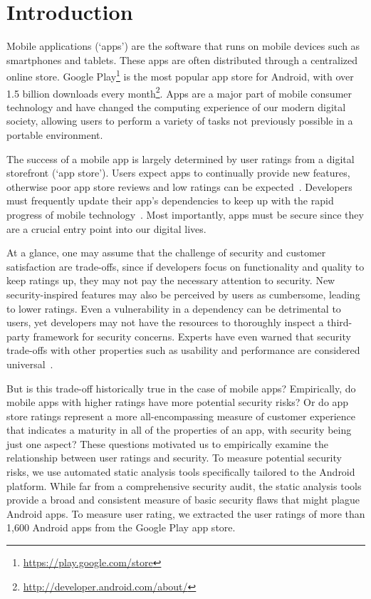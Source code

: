 \documentclass{sig-alternate}
\begin{document}
\section{Introduction}
%
Mobile applications (`apps') are the software that runs on mobile devices such as smartphones and tablets. These apps are often distributed through a centralized online store. Google Play\footnote{\url{https://play.google.com/store}} is the most popular app store for Android, with over 1.5 billion downloads every month\footnote{\url{http://developer.android.com/about/}}. Apps are a major part of mobile consumer technology and have changed the computing experience of our modern digital society, allowing users to perform a variety of tasks not previously possible in a portable environment.


The success of a mobile app is largely determined by user ratings from a digital storefront (`app store'). Users expect apps to continually provide new features, otherwise poor app store reviews and low ratings can be expected~\cite{Khalid2014}. Developers must frequently update their app's dependencies to keep up with the rapid progress of mobile technology~\cite{Syer2013}. Most importantly, apps must be secure since they are a crucial entry point into our digital lives.

At a glance, one may assume that the challenge of security and customer satisfaction are trade-offs, since if developers focus on functionality and quality to keep ratings up, they may not pay the necessary attention to security. New security-inspired features may also be perceived by users as cumbersome, leading to lower ratings. Even a vulnerability in a dependency can be detrimental to users, yet developers may not have the resources to thoroughly inspect a third-party framework for security concerns. Experts have even warned that security trade-offs with other properties such as usability and performance are considered universal~\cite{McGrawBSS}.

But is this trade-off historically true in the case of mobile apps? Empirically, do mobile apps with higher ratings have more potential security risks? Or do app store ratings represent a more all-encompassing measure of customer experience that indicates a maturity in all of the properties of an app, with security being just one aspect? These questions motivated us to empirically examine the relationship between user ratings and security. To measure potential security risks, we use automated static analysis tools specifically tailored to the Android platform. While far from a comprehensive security audit, the static analysis tools provide a broad and consistent measure of basic security flaws that might plague Android apps. To measure user rating, we extracted the user ratings of more than 1,600 Android apps from the Google Play app store.
\end{document}
